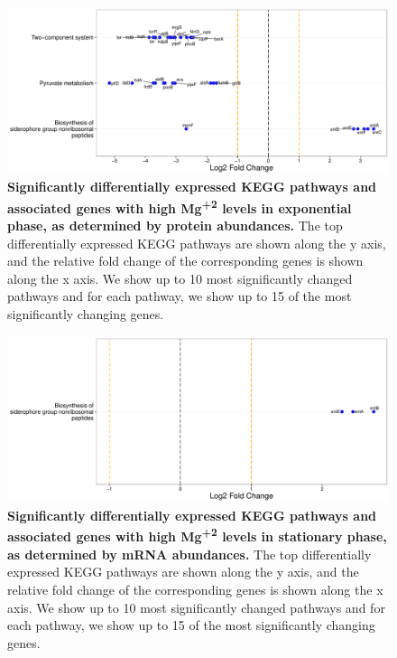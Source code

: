 \documentclass[a4paper]{article}
\begin{document}
\clearpage
\begin{figure}
	\includegraphics[width=1.0\textwidth]{../../d_figures/kegg_11.pdf}
	\caption[Significantly altered KEGG pathways for protein samples in exponential phase tested for high Mg\textsuperscript{+2} against base Mg\textsuperscript{+2}]
	{\textbf{Significantly differentially expressed KEGG pathways and associated genes with high Mg\textsuperscript{+2} levels in exponential phase, as determined by protein abundances.} The top differentially expressed KEGG pathways are shown along the y axis, and the relative fold change of the corresponding genes is shown along the x axis. We show up to 10 most significantly changed pathways and for each pathway, we show up to 15 of the most significantly changing genes.}
\end{figure}

\clearpage
\begin{figure}
	\includegraphics[width=1.0\textwidth]{../../d_figures/kegg_12.pdf}
	\caption[Significantly altered KEGG pathways for mRNA samples in stationary phase tested for high Mg\textsuperscript{+2} against base Mg\textsuperscript{+2}]
	{\textbf{Significantly differentially expressed KEGG pathways and associated genes with high Mg\textsuperscript{+2} levels in stationary phase, as determined by mRNA abundances.} The top differentially expressed KEGG pathways are shown along the y axis, and the relative fold change of the corresponding genes is shown along the x axis. We show up to 10 most significantly changed pathways and for each pathway, we show up to 15 of the most significantly changing genes.}
\end{figure}
\end{document}
